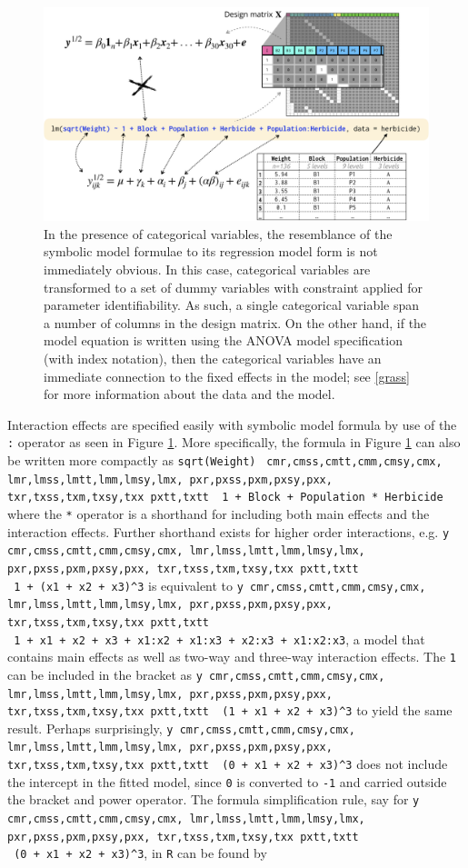 \documentclass[runningheads]{llncs}\usepackage[]{graphicx}\usepackage[]{color}
\makeatletter
\newcommand\midtilde@raisedtilde[1][.5]{\raisebox{#1ex}{\texttildelow}}
\def\midtilde@normaltilde{\texttildelow}
\newcommand\midtilde%
{%
  \expandafter\in@\expandafter{\f@family}%
    {cmr,cmss,cmtt,cmm,cmsy,cmx,%
    lmr,lmss,lmtt,lmm,lmsy,lmx,%
    pxr,pxss,pxm,pxsy,pxx,%
    txr,txss,txm,txsy,txx}%
  \ifin@%
    \midtilde@raisedtilde%
  \else%
    \expandafter\in@\expandafter{\f@family}%
    {pxtt,txtt}%
    \ifin@%
      \midtilde@raisedtilde[.35]%
    \else%
      \midtilde@normaltilde%
    \fi%
  \fi%
}
\makeatother
\begin{document}
\begin{figure}
	\includegraphics[width=0.9\linewidth,fbox]{images/symbolic_lm_factor} \caption{In the presence of categorical variables, the resemblance of the symbolic model formulae to its regression model form is not immediately obvious. In this case, categorical variables are transformed to a set of dummy variables with constraint applied for parameter identifiability. As such, a single categorical variable span a number of columns in the design matrix. On the other hand, if the model equation is written using the ANOVA model specification (with index notation), then the categorical variables have an immediate connection to the fixed effects in the model; see \ref{grass} for more information about the data and the model.}\label{fig:symbolic-lm-factor}
\end{figure}



Interaction effects are specified easily with symbolic model formula by use of the \texttt{:} operator as seen in Figure \ref{fig:symbolic-lm-factor}. More specifically, the formula in Figure \ref{fig:symbolic-lm-factor} can also be written more compactly as \texttt{sqrt(Weight)} \texttt{\midtilde\ }\texttt{1\ +\ Block\ +\ Population\ *\ Herbicide} where the \texttt{*} operator is a shorthand for including both main effects and the interaction effects. Further shorthand exists for higher order interactions, e.g. \texttt{y \midtilde\ }\texttt{1\ +\ (x1\ +\ x2\ +\ x3)\^{}3} is equivalent to
\texttt{y \midtilde\ }\texttt{1\ +\ x1\ +\ x2\ +\ x3\ +\ x1:x2\ +\ x1:x3\ +\ x2:x3\ +\ x1:x2:x3}, a model that contains main effects as well as two-way and three-way interaction effects. The \texttt{1} can be included in the bracket as \texttt{y \midtilde\ }\texttt{(1\ +\ x1\ +\ x2\ +\ x3)\^{}3} to yield the same result. Perhaps surprisingly, \texttt{y \midtilde\ }\texttt{(0\ +\ x1\ +\ x2\ +\ x3)\^{}3} does not include the intercept in the fitted model, since \texttt{0} is converted to \texttt{-1} and carried outside the bracket and power operator. The formula simplification rule, say for \texttt{y \midtilde\ }\texttt{(0\ +\ x1\ +\ x2\ +\ x3)\^{}3}, in \texttt{R} can be found by
\end{document}
